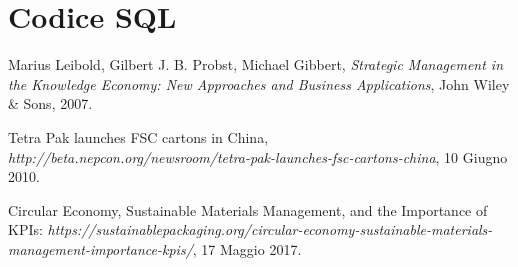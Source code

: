 \documentclass[paper=a4, fontsize=11pt,x11names]{report}
\begin{document}
\chapter{Codice SQL}





\begin{thebibliography}{9}


 Marius Leibold, Gilbert J. B. Probst, Michael Gibbert,
  \textit{Strategic Management in the Knowledge Economy: New Approaches and Business Applications},
  John Wiley \& Sons,
 2007.
 
	Tetra Pak launches FSC cartons in China, \textit{http://beta.nepcon.org/newsroom/tetra-pak-launches-fsc-cartons-china},
	10 Giugno 2010.
	
	Circular Economy, Sustainable Materials Management, and the Importance of KPIs: \textit{https://sustainablepackaging.org/circular-economy-sustainable-materials-management-importance-kpis/},
	17 Maggio 2017.

\end{thebibliography}


\end{document}
